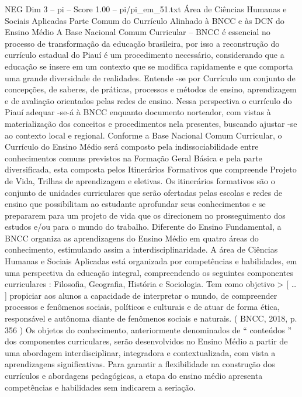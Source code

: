 \begin{textsample}{NEG Dim 3 – pi – Score 1.00 – pi/pi\_em\_51.txt}  \label{ex:f3_neg_040}
Área de Ciências Humanas e Sociais Aplicadas Parte Comum do Currículo Alinhado à BNCC e às DCN do Ensino Médio A Base Nacional Comum Curricular – BNCC é essencial no processo de transformação da educação brasileira, por isso a reconstrução do currículo estadual do Piauí é um procedimento necessário, considerando que a educação se insere em um contexto que se modifica rapidamente e que comporta uma grande diversidade de realidades.
Entende -se por Currículo um conjunto de concepções, de saberes, de práticas, processos e métodos de ensino, aprendizagem e de avaliação orientados pelas redes de ensino.
Nessa perspectiva o currículo do Piauí adequar -se-á à BNCC enquanto documento norteador, com vistas à materialização dos conceitos e procedimentos nela presentes, buscando ajustar -se ao contexto local e regional.
Conforme a Base Nacional Comum Curricular, o Currículo do Ensino Médio será composto pela indissociabilidade entre conhecimentos comuns previstos na Formação Geral Básica e pela parte diversificada, esta composta pelos Itinerários Formativos que compreende Projeto de Vida, Trilhas de aprendizagem e eletivas.
Os itinerários formativos são o conjunto de unidades curriculares que serão ofertadas pelas escolas e redes de ensino que possibilitam ao estudante aprofundar seus conhecimentos e se prepararem para um projeto de vida que os direcionem no prosseguimento dos estudos e/ou para o mundo do trabalho.
Diferente do Ensino Fundamental, a BNCC organiza as aprendizagens do Ensino Médio em quatro áreas do conhecimento, estimulando assim a interdisciplinaridade.
A área de Ciências Humanas e Sociais Aplicadas está organizada por competências e habilidades, em uma perspectiva da educação integral, compreendendo os seguintes componentes curriculares : Filosofia, Geografia, História e Sociologia.
Tem como objetivo > [ … ] propiciar aos alunos a capacidade de interpretar o mundo, de compreender processos e fenômenos sociais, políticos e culturais e de atuar de forma ética, responsável e autônoma diante de fenômenos sociais e naturais. ( BNCC, 2018, p. 356 ) Os objetos do conhecimento, anteriormente denominados de “ conteúdos ” dos componentes curriculares, serão desenvolvidos no Ensino Médio a partir de uma abordagem interdisciplinar, integradora e contextualizada, com vista a aprendizagens significativas.
Para garantir a flexibilidade na construção dos currículos e abordagens pedagógicas, a etapa do ensino médio apresenta competências e habilidades sem indicarem a seriação.

\end{textsample}
